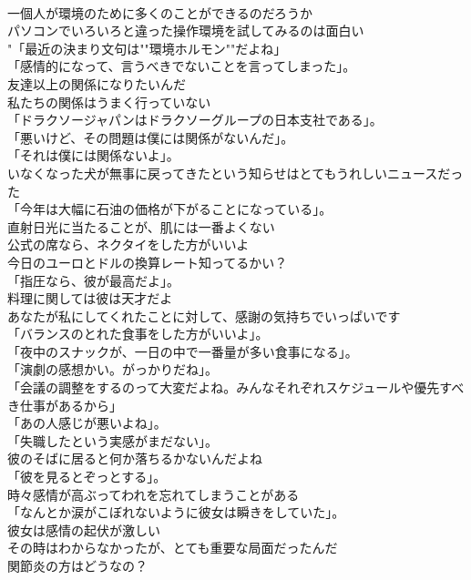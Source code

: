 \documentclass[8pt]{extreport}
\begin{document}
\begin{CJK}{UTF8}{min}
\\	一個人が環境のために多くのことができるのだろうか	
\\	パソコンでいろいろと違った操作環境を試してみるのは面白い	
\\	"「最近の決まり文句は""環境ホルモン""だよね」
\\	「感情的になって、言うべきでないことを言ってしまった」。	
\\	友達以上の関係になりたいんだ	
\\	私たちの関係はうまく行っていない	
\\	「ドラクソージャパンはドラクソーグループの日本支社である」。	
\\	「悪いけど、その問題は僕には関係がないんだ」。	
\\	「それは僕には関係ないよ」。	
\\	いなくなった犬が無事に戻ってきたという知らせはとてもうれしいニュースだった	
\\	「今年は大幅に石油の価格が下がることになっている」。	
\\	直射日光に当たることが、肌には一番よくない	
\\	公式の席なら、ネクタイをした方がいいよ	
\\	今日のユーロとドルの換算レート知ってるかい？	
\\	「指圧なら、彼が最高だよ」。	
\\	料理に関しては彼は天才だよ	
\\	あなたが私にしてくれたことに対して、感謝の気持ちでいっぱいです	
\\	「バランスのとれた食事をした方がいいよ」。	
\\	「夜中のスナックが、一日の中で一番量が多い食事になる」。	
\\	「演劇の感想かい。がっかりだね」。	
\\	「会議の調整をするのって大変だよね。みんなそれぞれスケジュールや優先すべき仕事があるから」	
\\	「あの人感じが悪いよね」。	
\\	「失職したという実感がまだない」。	
\\	彼のそばに居ると何か落ちるかないんだよね	
\\	「彼を見るとぞっとする」。	
\\	時々感情が高ぶってわれを忘れてしまうことがある	
\\	「なんとか涙がこぼれないように彼女は瞬きをしていた」。	
\\	彼女は感情の起伏が激しい	
\\	その時はわからなかったが、とても重要な局面だったんだ	
\\	関節炎の方はどうなの？	

\end{CJK}
\end{document}

